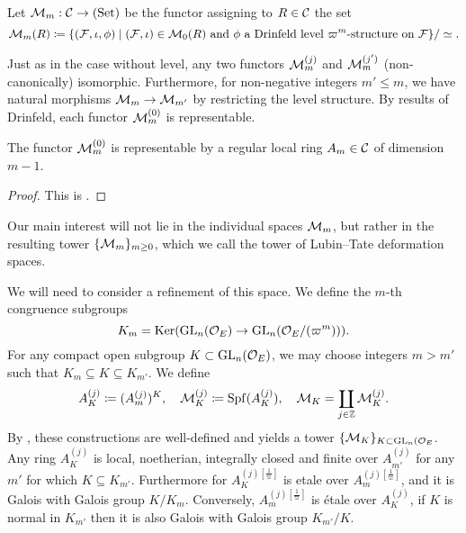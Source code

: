 \documentclass[../main.tex]{subfiles}
\begin{document}
\begin{defi}\label{def:LTDefSpaceWithLevel}
  Let $\mathcal{M}_m: \mathcal{C} \to {(\mathrm{Set})}$ be the functor assigning to $R \in \mathcal{C}$ the set 
  \begin{equation*}
    \mathcal{M}_m(R) \coloneqq \{(\mathcal{F}, \iota, \phi) \mid (\mathcal{F}, \iota) \in \mathcal{M}_0(R) \text{ and }\phi
    \text{ a Drinfeld level $\varpi^m$-structure on $\mathcal{F}$}\}/\simeq.
  \end{equation*}
\end{defi}

Just as in the case without level, any two functors $\mathcal{M}_m^{(j)}$ and
$\mathcal{M}_m^{(j')}$ (non-canonically) isomorphic.
Furthermore, for non-negative integers $m' \leq m$, we have natural morphisms
$\mathcal{M}_m \to \mathcal{M}_{m'}$ by restricting the level structure. 
By results of Drinfeld, each functor $\mathcal{M}_m^{(0)}$ is representable.

\begin{thm}\label{thm:RepresentabilityOfDefSpaceWithLevel}
  The functor $\mathcal{M}_m^{(0)}$ is representable by a regular local ring $A_m \in \mathcal{C}$ of 
  dimension $m-1$.
\begin{proof}
  This is \cite[Proposition 4.3]{drinfel1974elliptic}.
\end{proof}
\end{thm}

Our main interest will
not lie in the individual spaces $\mathcal{M}_m$, but rather in the resulting tower
$\{\mathcal{M}_m\}_{m \geq 0}$, which we call the tower of Lubin--Tate deformation
spaces.

We will need to consider a refinement of this space. We define the 
$m$-th congruence subgroups
\begin{equation*}
  K_m = \operatorname{Ker}(\operatorname{GL}_n(\mathcal{O}_E) \to \operatorname{GL}_n(\mathcal{O}_E/(\varpi^m))).
\end{equation*}
For any compact open subgroup $K \subset \operatorname{GL}_n(\mathcal{O}_E)$, we may choose integers
$m > m'$ such that $K_m \subseteq K \subseteq K_{m'}$. We define 
\begin{equation*}
  A_K^{(j)} \coloneq (A^{(j)}_m)^K, \quad \mathcal{M}_K^{(j)} \coloneq \operatorname{Spf}(A_K^{(j)}), \quad
  \mathcal{M}_K = \coprod_{j \in \mathbb{Z}} \mathcal{M}_K^{(j)}.
\end{equation*}
By \cite[Proposition 2.2.5]{Strauch2008DefSp}, these constructions are well-defined
and yields a tower $\{\mathcal{M}_K\}_{K \subset \operatorname{GL}_n(\mathcal{O}_E}$. Any ring
$A_K^{(j)}$ is local, noetherian, integrally closed and finite over
$A_{m'}^{(j)}$ for any $m'$ for which $K \subseteq K_{m'}$. Furthermore for 
$A_{K}^{(j)[\tfrac 1 \varpi]}$ is etale over $A_{m}^{(j)[\tfrac 1 \varpi]}$, 
and it is Galois with Galois group $K/K_m$. Conversely, $A_{m}^{(j)[\tfrac 1 \varpi]}$
is \'etale over $A_K^{(j)}$, if $K$ is normal in $K_{m'}$ then it is also Galois with
Galois group $K_{m'}/K$. 
\end{document}
